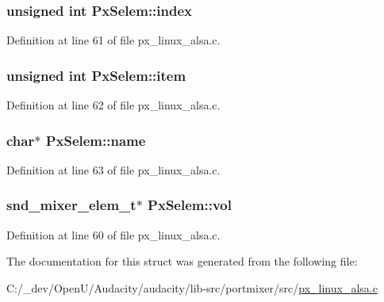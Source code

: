 \subsubsection[{\texorpdfstring{index}{index}}]{\setlength{\rightskip}{0pt plus 5cm}unsigned {\bf int} Px\+Selem\+::index}\hypertarget{struct_px_selem_aa7ce2e1cf77ca2d456c6a53d36acd4bd}{}\label{struct_px_selem_aa7ce2e1cf77ca2d456c6a53d36acd4bd}


Definition at line 61 of file px\+\_\+linux\+\_\+alsa.\+c.

\subsubsection[{\texorpdfstring{item}{item}}]{\setlength{\rightskip}{0pt plus 5cm}unsigned {\bf int} Px\+Selem\+::item}\hypertarget{struct_px_selem_a0df29cae2f100b17311e53be237a4b58}{}\label{struct_px_selem_a0df29cae2f100b17311e53be237a4b58}


Definition at line 62 of file px\+\_\+linux\+\_\+alsa.\+c.

\subsubsection[{\texorpdfstring{name}{name}}]{\setlength{\rightskip}{0pt plus 5cm}char$\ast$ Px\+Selem\+::name}\hypertarget{struct_px_selem_a201584990e20d587b7758e3056cb3613}{}\label{struct_px_selem_a201584990e20d587b7758e3056cb3613}


Definition at line 63 of file px\+\_\+linux\+\_\+alsa.\+c.

\subsubsection[{\texorpdfstring{vol}{vol}}]{\setlength{\rightskip}{0pt plus 5cm}snd\+\_\+mixer\+\_\+elem\+\_\+t$\ast$ Px\+Selem\+::vol}\hypertarget{struct_px_selem_aaa664a3d83e0785c233e8a74756995c0}{}\label{struct_px_selem_aaa664a3d83e0785c233e8a74756995c0}


Definition at line 60 of file px\+\_\+linux\+\_\+alsa.\+c.



The documentation for this struct was generated from the following file\+:\begin{DoxyCompactItemize}
\item 
C\+:/\+\_\+dev/\+Open\+U/\+Audacity/audacity/lib-\/src/portmixer/src/\hyperlink{px__linux__alsa_8c}{px\+\_\+linux\+\_\+alsa.\+c}\end{DoxyCompactItemize}
